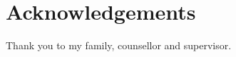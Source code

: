 \chapter*{Acknowledgements}
\vspace{1cm}

\noindent
Thank you to my family, counsellor and supervisor.
